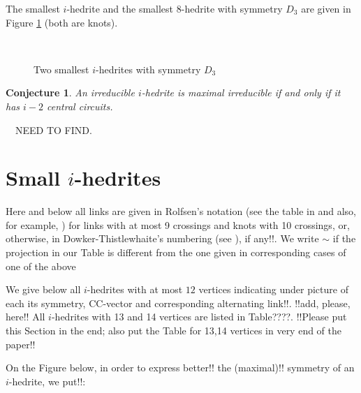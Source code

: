 \documentclass[12pt]{article}
\newtheorem{conjecture}{Conjecture}
\newcommand{\proof}{\noindent{\bf Proof.}\ \ }
\begin{document}
\begin{center}
\epsfxsize=60mm
\end{center}



The smallest $i$-hedrite and the smallest $8$-hedrite with symmetry $D_3$ are given in Figure \ref{fig:WithSymmetryD3} (both are knots).




\begin{figure}
\centering
\mbox{\quad
{}}\caption{Two smallest $i$-hedrites with symmetry $D_3$}
\label{fig:WithSymmetryD3}
\end{figure}









\begin{conjecture}
An irreducible $i$-hedrite is maximal irreducible if and only if it has $i-2$ central circuits.
\end{conjecture}
\proof NEED TO FIND.





\section{Small $i$-hedrites}

Here and below all links are given 
in Rolfsen's notation (see the table in \cite{Rolf} and also,  
for example, \cite{Kaw}) for links with at most 9 
crossings and knots with 10 crossings, or, otherwise, in
Dowker-Thistlewhaite's numbering (see \cite{T}), if any!!.
We write $\sim$ if the projection in our Table is different 
from the one given in corresponding cases of one of the above 

We give below all $i$-hedrites with at most $12$ vertices indicating under 
picture of each its symmetry, CC-vector and corresponding 
alternating link!!.
!!add, please, here!! All $i$-hedrites with 13 and 14 vertices are listed
in Table????.
!!Please put this Section in the end; also put the Table for 13,14
vertices in very end of the paper!! 


On the Figure below, in order to express better!! the (maximal)!!
symmetry of an $i$-hedrite, we put!!:
\end{document}
